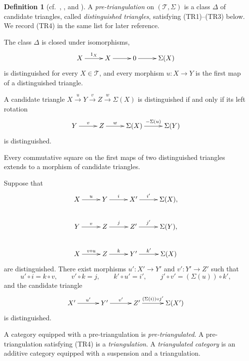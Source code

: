 \documentclass[a4paper,11pt,reqno]{amsart}
\theoremstyle{definition}
\newtheorem{definition}[definition]{Definition}
\theoremstyle{plain}
\numberwithin{equation}{section}
\newcommand{\T}{\mathcal T}
\begin{document}
\begin{definition}[{\normalfont cf.~\cite[Definition~2.2]{ChenLiuLuZhang2026},
\cite[Definitions~1.1.1--1.1.2]{Neeman2001}, and \cite{Puppe1967}}]
A \emph{pre-triangulation} on $(\T,\Sigma)$ is a class $\Delta$ of
candidate triangles, called \emph{distinguished triangles}, satisfying
\textup{(TR1)}--\textup{(TR3)} below.  We record \textup{(TR4)} in the
same list for later reference.
\begin{description}[leftmargin=4.2em,style=nextline]
\item[\textup{(TR1)}]
The class $\Delta$ is closed under isomorphisms,
\begin{equation*}
	\xymatrix@C=2.2pc{
		X\ar[r]^-{1_X}&X\ar[r]&0\ar[r]&\Sigma(X)
	}
\end{equation*}
is distinguished for every $X\in\T$, and every morphism
$u:X\to Y$ is the first map of a distinguished triangle.
\item[\textup{(TR2)}]
A candidate triangle
$X\xrightarrow{u}Y\xrightarrow{v}Z\xrightarrow{w}\Sigma(X)$
is distinguished if and only if its left rotation
\begin{equation*}
	\xymatrix@C=2.2pc{
		Y\ar[r]^-{v}&Z\ar[r]^-{w}&
		\Sigma(X)\ar[r]^-{-\Sigma(u)}&\Sigma(Y)
	}
\end{equation*}
is distinguished.
\item[\textup{(TR3)}]
Every commutative square on the first maps of two distinguished triangles
extends to a morphism of candidate triangles.
\item[\textup{(TR4)}]
Suppose that
\begin{equation*}
	\xymatrix@C=2.2pc{
		X\ar[r]^-{u}&Y\ar[r]^-{i}&X'\ar[r]^-{i'}&\Sigma(X),\\
		Y\ar[r]^-{v}&Z\ar[r]^-{j}&Z'\ar[r]^-{j'}&\Sigma(Y),\\
		X\ar[r]^-{v\circ u}&Z\ar[r]^-{k}&Y'\ar[r]^-{k'}&\Sigma(X)
	}
\end{equation*}
are distinguished.  There exist morphisms
$u':X'\to Y'$ and $v':Y'\to Z'$ such that
\[
 u'\circ i=k\circ v,\qquad
 v'\circ k=j,\qquad
 k'\circ u'=i',\qquad
 j'\circ v'=(\Sigma(u))\circ k',
\]
and the candidate triangle
\begin{equation*}
	\xymatrix@C=2.6pc{
		X'\ar[r]^-{u'}&Y'\ar[r]^-{v'}&
		Z'\ar[r]^-{(\Sigma(i))\circ j'}&\Sigma(X')
	}
\end{equation*}
is distinguished.
\end{description}
A category equipped with a pre-triangulation is
\emph{pre-triangulated}.  A pre-triangulation satisfying
\textup{(TR4)} is a \emph{triangulation}.  A \emph{triangulated category}
is an additive category equipped with a suspension and a triangulation.
\end{definition}
\end{document}
